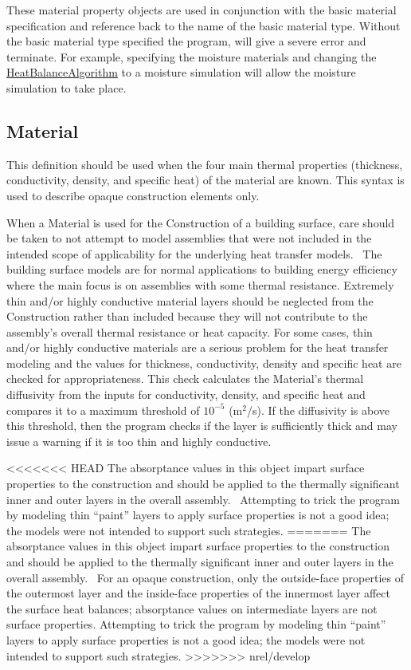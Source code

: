 These material property objects are used in conjunction with the basic material specification and reference back to the name of the basic material type. Without the basic material type specified the program, will give a severe error and terminate. For example, specifying the moisture materials and changing the \hyperref[heatbalancealgorithm]{HeatBalanceAlgorithm} to a moisture simulation will allow the moisture simulation to take place.

\subsection{Material}\label{material}

This definition should be used when the four main thermal properties (thickness, conductivity, density, and specific heat) of the material are known. This syntax is used to describe opaque construction elements only.

When a Material is used for the Construction of a building surface, care should be taken to not attempt to model assemblies that were not included in the intended scope of applicability for the underlying heat transfer models.~ The building surface models are for normal applications to building energy efficiency where the main focus is on assemblies with some thermal resistance. Extremely thin and/or highly conductive material layers should be neglected from the Construction rather than included because they will not contribute to the assembly's overall thermal resistance or heat capacity. For some cases, thin and/or highly conductive materials are a serious problem for the heat transfer modeling and the values for thickness, conductivity, density and specific heat are checked for appropriateness. This check calculates the Material's thermal diffusivity from the inputs for conductivity, density, and specific heat and compares it to a maximum threshold of $10^{-5}$ (m\(^{2}\)/s). If the diffusivity is above this threshold, then the program checks if the layer is sufficiently thick and may issue a warning if it is too thin and highly conductive.

<<<<<<< HEAD
The absorptance values in this object impart surface properties to the construction and should be applied to the thermally significant inner and outer layers in the overall assembly.~ Attempting to trick the program by modeling thin ``paint'' layers to apply surface properties is not a good idea; the models were not intended to support such strategies.
=======
The absorptance values in this object impart surface properties to the construction and should be applied to the thermally significant inner and outer layers in the overall assembly.~ For an opaque construction, only the outside-face properties of the outermost layer and the inside-face properties of the innermost layer affect the surface heat balances; absorptance values on intermediate layers are not surface properties. Attempting to trick the program by modeling thin ``paint'' layers to apply surface properties is not a good idea; the models were not intended to support such strategies.
>>>>>>> nrel/develop

